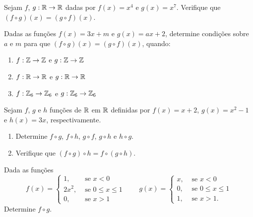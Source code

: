 \documentclass[12pt]{exam}
\begin{document}
    \vspace{.3cm}

    \questao{} Sejam $f$, $g : \mathbb{R} \to \mathbb{R}$ dadas por $f(x) = x^4$ e $g(x) = x^7$. Verifique que $(f\circ g)(x) = (g\circ f)(x)$.

    \vspace{.3cm}

    \questao{} Dadas as fun\c{c}\~oes $f(x) = 3x + m$ e $g(x) = ax + 2$, determine condi\c{c}\~oes sobre $a$ e $m$ para que $(f\circ g)(x) = (g\circ f)(x)$, quando:
    \begin{enumerate}[label={\roman*})]
        \item $f : \mathbb{Z} \to \mathbb{Z}$ e $g : \mathbb{Z} \to \mathbb{Z}$
        \item $f : \mathbb{R} \to \mathbb{R}$ e $g : \mathbb{R} \to \mathbb{R}$
        \item $f : \mathbb{Z}_6 \to \mathbb{Z}_6$ e $g : \mathbb{Z}_6 \to \mathbb{Z}_6$
    \end{enumerate}

    \vspace{.3cm}

    \questao{} Sejam $f$, $g$ e $h$ fun\c{c}\~oes de $\mathbb{R}$ em $\mathbb{R}$ definidas por $f(x) = x + 2$, $g(x) = x^2 - 1$ e $h(x) = 3x$, respectivamente.
    \begin{enumerate}[label={\alph*})]
        \item Determine $f \circ g$, $f \circ h$, $g \circ f$, $g \circ h$ e $h \circ g$.
        \item Verifique que $(f \circ g)\circ h = f \circ (g \circ h)$.
    \end{enumerate}

    \vspace{.3cm}

    \questao{} Dada as fun\c{c}\~oes
    \[
        f(x) = \begin{cases}
            1, & \mbox{ se } x < 0\\
            2x^2, & \mbox{ se } 0 \le x \le 1\\
            0, & \mbox{ se } x > 1
        \end{cases} \qquad g(x) = \begin{cases}
            x, & \mbox{ se } x < 0\\
            0, & \mbox{ se } 0 \le x \le 1\\
            1, & \mbox{ se } x > 1.
        \end{cases}
    \]
    Determine $f\circ g$.

    \vspace{.3cm}
\end{document}
